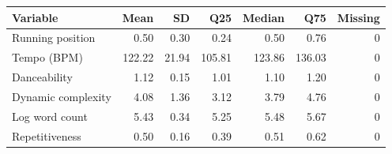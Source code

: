 \begin{tabular}{lrrrrrr}
\toprule
Variable & Mean & SD & Q25 & Median & Q75 & Missing \\
\midrule
Running position & 0.50 & 0.30 & 0.24 & 0.50 & 0.76 & 0 \\
Tempo (BPM) & 122.22 & 21.94 & 105.81 & 123.86 & 136.03 & 0 \\
Danceability & 1.12 & 0.15 & 1.01 & 1.10 & 1.20 & 0 \\
Dynamic complexity & 4.08 & 1.36 & 3.12 & 3.79 & 4.76 & 0 \\
Log word count & 5.43 & 0.34 & 5.25 & 5.48 & 5.67 & 0 \\
Repetitiveness & 0.50 & 0.16 & 0.39 & 0.51 & 0.62 & 0 \\
\bottomrule
\end{tabular}
